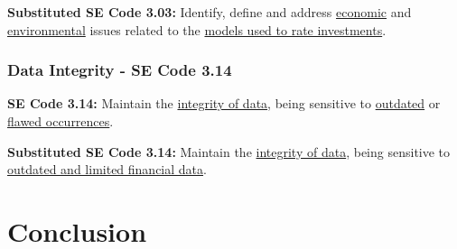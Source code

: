 \documentclass[11pt]{article}
\begin{document}
\begin{multicols}{2}
   
\begin{framed}
\noindent
   \textbf{Substituted SE Code 3.03: }  
   \newline
   Identify, define and address \underline{economic} and \underline{environmental} issues related to the \underline{models used to rate investments}.
\end{framed}


\subsubsection{Data Integrity - SE Code 3.14}

\begin{framed}
\noindent
   \textbf{SE Code 3.14: } 
   \newline
   Maintain the \underline{integrity of data}, being sensitive to \underline{outdated} or \underline{flawed occurrences}.
\end{framed}


\begin{framed}
\noindent
   \textbf{Substituted SE Code 3.14: } 
   \newline
   Maintain the \underline{integrity of data}, being sensitive to \underline{outdated and limited financial data}.
\end{framed}


\section{Conclusion}

\end{multicols}
\newpage


\nocite{*}




\end{document}
